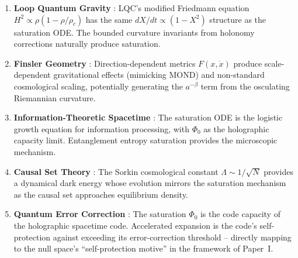 \documentclass[aps,prd,twocolumn,superscriptaddress,nofootinbib]{revtex4-2}
\begin{document}
\begin{enumerate}
\item \textbf{Loop Quantum Gravity} \cite{Rovelli2004}: LQC's modified Friedmann equation $H^2 \propto \rho(1 - \rho/\rho_c)$ has the same $dX/dt \propto (1-X^2)$ structure as the saturation ODE. The bounded curvature invariants from holonomy corrections naturally produce saturation.

\item \textbf{Finsler Geometry} \cite{Bao2000}: Direction-dependent metrics $F(x, \dot{x})$ produce scale-dependent gravitational effects (mimicking MOND) and non-standard cosmological scaling, potentially generating the $a^{-\beta}$ term from the osculating Riemannian curvature.

\item \textbf{Information-Theoretic Spacetime} \cite{Bousso2002}: The saturation ODE is the logistic growth equation for information processing, with $\Phi_0$ as the holographic capacity limit. Entanglement entropy saturation \cite{VanRaamsdonk2010} provides the microscopic mechanism.

\item \textbf{Causal Set Theory} \cite{Bombelli1987}: The Sorkin cosmological constant $\Lambda \sim 1/\sqrt{N}$ provides a dynamical dark energy whose evolution mirrors the saturation mechanism as the causal set approaches equilibrium density.

\item \textbf{Quantum Error Correction} \cite{Almheiri2015}: The saturation $\Phi_0$ is the code capacity of the holographic spacetime code. Accelerated expansion is the code's self-protection against exceeding its error-correction threshold -- directly mapping to the null space's ``self-protection motive'' in the framework of Paper~I.


\end{enumerate}
\end{document}
